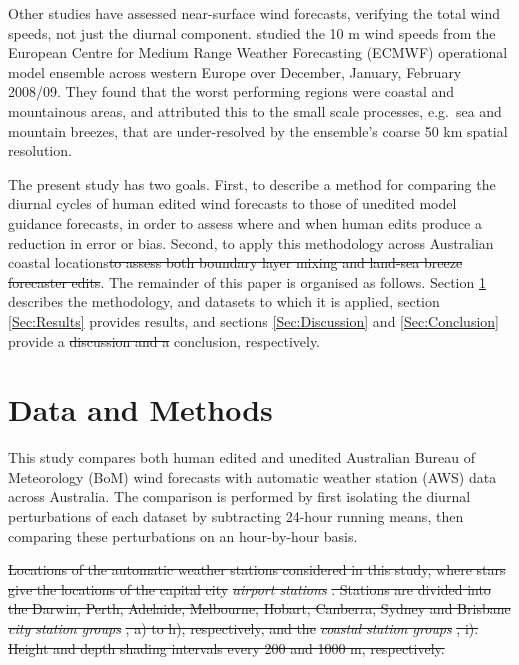 \documentclass{ametsoc}
\providecommand{\DIFadd}[1]{{\protect\color{blue}\uwave{#1}}} %
\providecommand{\DIFdel}[1]{{\protect\color{red}\sout{#1}}}                      %
\providecommand{\DIFaddbegin}{} %
\providecommand{\DIFaddend}{} %
\providecommand{\DIFdelbegin}{} %
\providecommand{\DIFdelend}{} %
\providecommand{\DIFdelFL}[1]{\DIFdel{#1}} %
\begin{document}
Other studies have assessed near-surface wind forecasts, verifying the total wind speeds, not just the diurnal component. \citet{pinson12} studied the 10 m wind speeds from the European Centre for Medium Range Weather Forecasting (ECMWF) operational model ensemble across western Europe over December, January, February 2008/09. They found that the worst performing regions were coastal and mountainous areas, and attributed this to the small scale processes, e.g.~sea and mountain breezes, that are under-resolved by the ensemble's coarse 50 km spatial resolution.

The present study has two goals. First, to describe a method for comparing the diurnal cycles of human edited wind forecasts to those of unedited model guidance forecasts, in order to assess where and when human \DIFaddbegin \DIFadd{choice of model guidance and }\DIFaddend edits produce a reduction in error or bias. Second, to apply this methodology across Australian coastal locations\DIFdelbegin \DIFdel{to assess both boundary layer mixing and land-sea breeze forecaster edits}\DIFdelend . The remainder of this paper is organised as follows. Section \ref{Sec:Methods} describes the methodology, and datasets to which it is applied, section \ref{Sec:Results} provides results, and sections \ref{Sec:Discussion} and \ref{Sec:Conclusion} provide a \DIFdelbegin \DIFdel{discussion and a }\DIFdelend \DIFaddbegin \DIFadd{synthesis and }\DIFaddend conclusion, respectively.

\section{Data and Methods} \label{Sec:Methods}
This study compares both human edited and unedited Australian Bureau of Meteorology (BoM) wind forecasts with automatic weather station (AWS) data across Australia. The comparison is performed by first isolating the diurnal perturbations of each dataset by subtracting 24-hour running means, then comparing these perturbations on an hour-by-hour basis.

\DIFdelbegin %
{%
\DIFdelFL{Locations of the automatic weather stations considered in this study, where stars give the locations of the capital city }\textit{\DIFdelFL{airport stations}}%
\DIFdelFL{. Stations are divided into the Darwin, Perth, Adelaide, Melbourne, Hobart, Canberra, Sydney and Brisbane }\textit{\DIFdelFL{city station groups}}%
\DIFdelFL{, a) to h), respectively, and the }\textit{\DIFdelFL{coastal station groups}}%
\DIFdelFL{, i).  Height and depth shading intervals every 200 and 1000 m, respectively.}}
\end{document}
